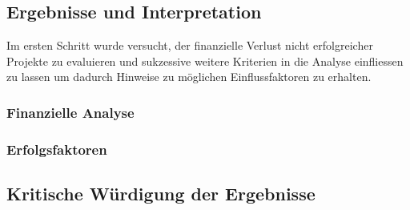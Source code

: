 \subsection{Ergebnisse und Interpretation}
Im ersten Schritt wurde versucht, der finanzielle Verlust nicht erfolgreicher Projekte zu evaluieren und sukzessive weitere Kriterien in die Analyse einfliessen zu lassen um dadurch Hinweise zu möglichen Einflussfaktoren zu erhalten.
\subsubsection{Finanzielle Analyse}

\subsubsection{Erfolgsfaktoren}
\subsection{Kritische Würdigung der Ergebnisse}
\newpage	
	


